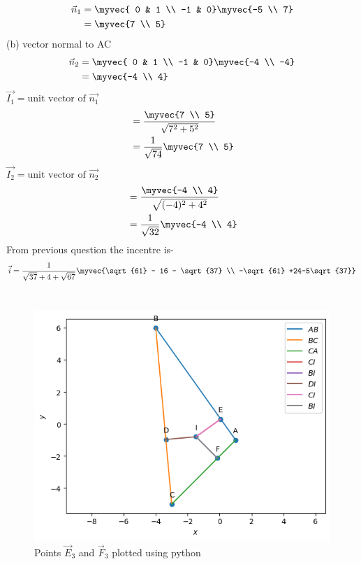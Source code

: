 \documentclass[journal,12pt,twocolumn]{IEEEtran}
\theoremstyle{remark}
\begin{document}
\begin{align}
\vec{n}_1 &= \myvec{ 0 & 1 \\ -1 & 0}\myvec{-5 \\ 7}\\
&= \myvec{7 \\ 5}
\end{align}
(b) vector normal to AC
\begin{align}
\vec{n}_2 &= \myvec{ 0 & 1 \\ -1 & 0}\myvec{-4 \\ -4}\\
&= \myvec{-4 \\ 4}
\end{align}
$\vec{I_1} = \text{unit vector of }\vec{n_1}$
\begin{align}
&= \frac{\myvec{7 \\ 5}}{\sqrt{7^2 + 5^2}}\\
&=\frac{1}{\sqrt{74}}\myvec{7 \\ 5}
\end{align}
$\vec{I_2}= \text{unit vector of }\vec{n_2}$
\begin{align}
&= \frac{\myvec{-4 \\ 4}}{\sqrt{(-4)^2 + 4^2}}\\
&=\frac{1}{\sqrt{32}}\myvec{-4 \\ 4}
\end{align}
From previous question the incentre is-
\begin{align}
\vec{i} = \frac{1}{\sqrt{37} + 4 + \sqrt{67}}\myvec{\sqrt{61} - 16 - \sqrt{37} \\ -\sqrt{61} +24-5\sqrt{37}} 
\end{align}\\
\begin{figure}[H]
\includegraphics[width=\columnwidth]{codes/Incentre.png}
\caption{Points $\vec{E}_3$ and $\vec{F}_3$ plotted using python}
\label{fig:i_tri_py}
\end{figure}
\end{document}

